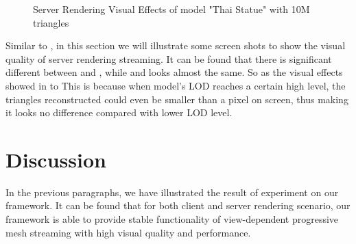 \begin{figure}
\centering
{}
\hfill
{}
\hfill
{}
\hfill
{}
\hfill
{}

\label{fig:thai_serverrendering_visual_effects}
\caption{Server Rendering Visual Effects of model "Thai Statue" with 10M triangles}
\end{figure}

Similar to , in this section we will illustrate some screen shots to show the visual quality of server rendering streaming. It can be found that there is significant different between  and , while  and  looks almost the same. So as the visual effects showed in  to This is because when model's LOD reaches a certain high level, the triangles reconstructed could even be smaller than a pixel on screen, thus making it looks no difference compared with lower LOD level. 

\section{Discussion}
\label{section:results:discussion}
In the previous paragraphs, we have illustrated the result of experiment on our framework. It can be found that for both client and server rendering scenario, our framework is able to provide stable functionality of view-dependent progressive mesh streaming with high visual quality and performance. \\

